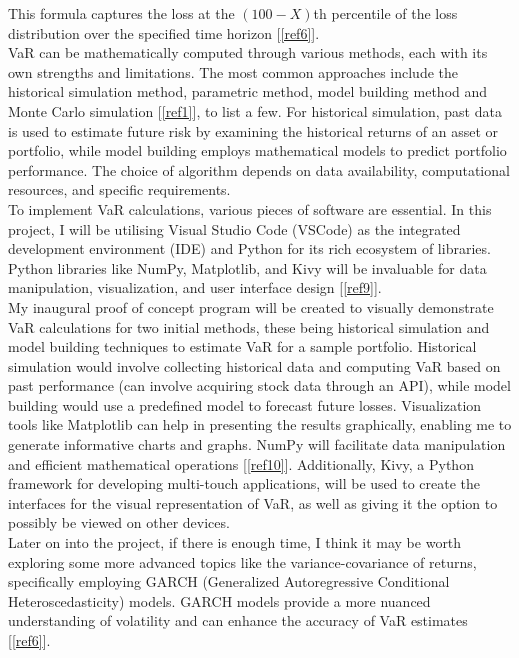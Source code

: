 \documentclass{article}
\begin{document}
This formula captures the loss at the \((100-X)\)th percentile of the loss distribution over the specified time horizon [\ref{ref6}]. \\

VaR can be mathematically computed through various methods, each with its own strengths and limitations. The most common approaches include the historical simulation method, parametric method, model building method and Monte Carlo simulation [\ref{ref1}], to list a few. For historical simulation, past data is used to estimate future risk by examining the historical returns of an asset or portfolio, while model building employs mathematical models to predict portfolio performance. The choice of algorithm depends on data availability, computational resources, and specific requirements. \\

To implement VaR calculations, various pieces of software are essential. In this project, I will be utilising Visual Studio Code (VSCode) as the integrated development environment (IDE) and Python for its rich ecosystem of libraries. Python libraries like NumPy, Matplotlib, and Kivy will be invaluable for data manipulation, visualization, and user interface design [\ref{ref9}]. \\

My inaugural proof of concept program will be created to visually demonstrate VaR calculations for  two initial methods, these being historical simulation and model building techniques to estimate VaR for a sample portfolio. Historical simulation would involve collecting historical data and computing VaR based on past performance (can involve acquiring stock data through an API), while model building would use a predefined model to forecast future losses. Visualization tools like Matplotlib can help in presenting the results graphically, enabling me to generate informative charts and graphs. NumPy will facilitate data manipulation and efficient mathematical operations [\ref{ref10}]. Additionally, Kivy, a Python framework for developing multi-touch applications, will be used to create the interfaces for the visual representation of VaR, as well as giving it the option to possibly be viewed on other devices. \\

Later on into the project, if there is enough time, I think it may be worth exploring some more advanced topics like the variance-covariance of returns, specifically employing GARCH (Generalized Autoregressive Conditional Heteroscedasticity) models. GARCH models provide a more nuanced understanding of volatility and can enhance the accuracy of VaR estimates [\ref{ref6}]. \\
\end{document}

